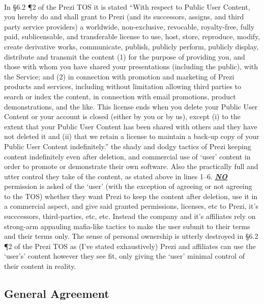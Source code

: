 \paragraph{}
In \S6.2 \P 2 of the Prezi\texttrademark{} TOS it is stated ``With
respect to Public User Content, you hereby do and shall grant to Prezi (and its
successors, assigns, and third party service providers) a worldwide,
non-exclusive, revocable, royalty-free, fully paid, sublicensable, and
transferable license to use, host, store, reproduce, modify, create derivative
works, communicate, publish, publicly perform, publicly display, distribute and
transmit the content (1) for the purpose of providing you, and those with whom
you have shared your presentations (including the public), with the Service;
and (2) in connection with promotion and marketing of Prezi products and
services, including without limitation allowing third parties to search or index
the content, in connection with email promotions, product demonstrations, and
the like. This license ends when you delete your Public User Content or your
account is closed (either by you or by us), except (i) to the extent that your
Public User Content has been shared with others and they have not deleted it
and (ii) that we retain a license to maintain a back-up copy of your Public User
Content indefinitely.'' the shady and dodgy tactics of Prezi\texttrademark{}
keeping content indefinitely even after deletion, and commercial use of `user'
content in order to promote or demonstrate their own software. Also the
practically full and utter control they take of the content, as stated above in
lines 1--6. \textit{\textbf{\underline{NO}}} permission is asked of the
`user' (with the exception of agreeing or not agreeing to the TOS) whether they
want Prezi\texttrademark{} to keep the content after deletion, use it in a
commercial aspect, and give said granted permissions, licenses, etc to
Prezi\texttrademark{}, it's succcessors, third-parties, etc, etc. Instead the
company and it's affiliates rely on strong-arm appauling mafia-like tactics to
make the user submit to their terms and their terms only. The sense of personal
ownership is utterly destroyed in \S6.2 \P 2 of the Prezi\texttrademark{} TOS as
(I've stated exhaustively) Prezi\texttrademark{} and affiliates can use the
`user's' content however they see fit, only giving the `user' minimal control
of their content in reality.
\par

\subsection{General Agreement}
